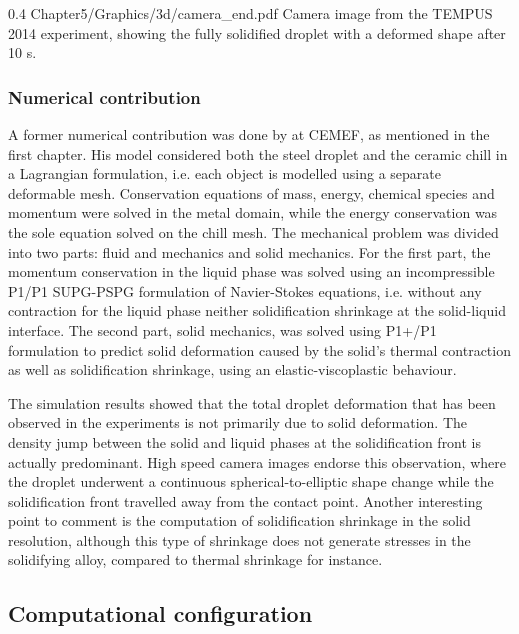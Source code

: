 \begin{figureth}
{0.4}
{Chapter5/Graphics/3d/camera_end.pdf}
{Camera image from the TEMPUS 2014 experiment, showing the fully solidified droplet with a deformed shape after 10 s.}
\label{fig:camera_end}
\end{figureth}

\subsubsection{Numerical contribution}

A former numerical contribution was done by \citet{rivaux_simulation_2011} at CEMEF, as mentioned in the first chapter. 
His model considered both the steel droplet and the ceramic chill in a Lagrangian formulation, i.e. each object is
modelled using a separate deformable mesh. Conservation equations of mass, energy,
chemical species and momentum were solved in the metal domain, while the energy
conservation was the sole equation solved on the chill mesh. The mechanical problem was divided
into two parts: fluid and mechanics and solid mechanics. For the first part, the momentum conservation in the liquid phase was solved using an
incompressible P1/P1 SUPG-PSPG formulation of Navier-Stokes equations, i.e. 
without any contraction for the liquid phase neither solidification shrinkage at the solid-liquid interface.
The second part, solid mechanics, was solved using P1+/P1 formulation to predict solid deformation caused by the 
solid's thermal contraction as well as solidification shrinkage, 
using an elastic-viscoplastic behaviour. 

The simulation results showed that the total droplet deformation that has been
observed in the experiments is not primarily due to solid deformation. The density jump
between the solid and liquid phases at the solidification front is actually predominant. High
speed camera images endorse this observation, where the droplet underwent a continuous
spherical-to-elliptic shape change while the solidification front travelled away from the
contact point. Another interesting point to comment is the computation of solidification
shrinkage in the solid resolution, although this type of shrinkage does not generate stresses 
in the solidifying alloy, compared to thermal shrinkage for instance.

\subsection{Computational configuration}

